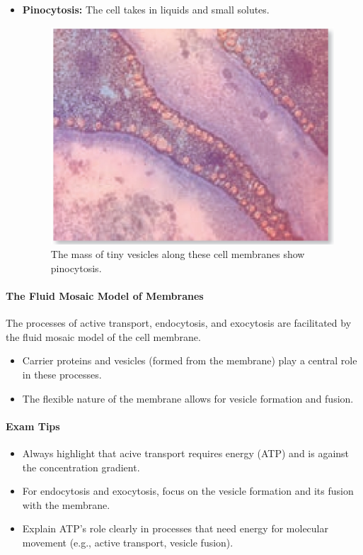 \begin{itemize}
\begin{itemize}
\begin{figure}[H]
        \end{figure}
        \item \textbf{Pinocytosis:} The cell takes in liquids and small solutes.
        \begin{figure}[H]
            \centering
            \includegraphics[scale=0.2]{Biology/2A/Images/2A-4-3.png}
            \caption{The mass of tiny vesicles along these cell membranes show pinocytosis.}
        \end{figure}
    \end{itemize}
\end{itemize}

\paragraph{The Fluid Mosaic Model of Membranes}
The processes of active transport, endocytosis, and exocytosis are facilitated by the fluid mosaic model of the cell membrane.
\begin{itemize}
    \item Carrier proteins and vesicles (formed from the membrane) play a central role in these processes.
    \item The flexible nature of the membrane allows for vesicle formation and fusion.
\end{itemize}

\paragraph{Exam Tips}
\begin{itemize}
    \item Always highlight that acive transport requires energy (ATP) and is against the concentration gradient.
    \item For endocytosis and exocytosis, focus on the vesicle formation and its fusion with the membrane.
    \item Explain ATP's role clearly in processes that need energy for molecular movement (e.g., active transport, vesicle
    fusion).
\end{itemize}